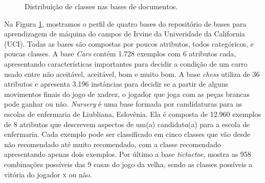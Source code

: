 \begin{figure}[!h]

\caption{Distribuição de classes nas bases de documentos.}
\label{fig::basesdoc}
\end{figure}

Na Figura \ref{fig::basesdoc}, mostramos o perfil de quatro bases do repositório de bases para aprendizagem de máquina do campos de Irvine da Univeridade da California (\textsc{UCI}). Todas as bases são compostas por poucos atributos, todos categóricos, e poucas classes. A base \textit{Cars} contém 1.728 exemplos com 6 atributos cada, apresentando características importantes para decidir a condição de um carro usado entre não aceitável, aceitável, bom e muito bom. A base \textit{chess} utiliza de 36 atributos e apresenta 3.196 instâncias para decidir se a partir de alguns movimentos finais do jogo de xadrez, o jogador que joga com as peças brancas pode ganhar ou não. \textit{Nursery} é uma base formada por candidaturas para as escolas de enfermaria de Liubliana, Eslovênia. Ela é composta de 12.960 exemplos de 8 atributos que descrevem aspectos de um(a) candidato(a) para a escola de enfermaria. Cada exemplo pode ser classificado em cinco classes que vão desde não recomendado até muito recomendado, com a classe recomendado apresentando apenas dois exemplos. Por último a base \textit{tictactoe}, mostra as 958 combinações possíveis das 9 casas do jogo da velha, sendo as classes possíveis a vitória do jogador \textsc{x} ou não.

